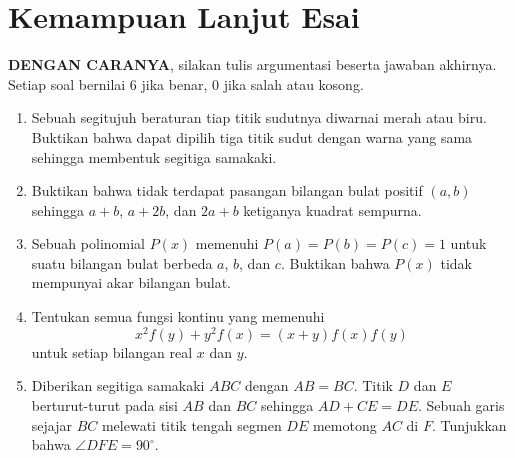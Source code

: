 \documentclass[12pt]{scrartcl}
\begin{document}
\section{Kemampuan Lanjut Esai}
\textbf{DENGAN CARANYA}, silakan tulis argumentasi beserta jawaban akhirnya. Setiap soal bernilai 6 jika benar, 0 jika salah atau kosong.
\begin{enumerate}[resume]
    \item Sebuah segitujuh beraturan tiap titik sudutnya diwarnai merah atau biru. Buktikan bahwa dapat dipilih tiga titik sudut dengan warna yang sama sehingga membentuk segitiga samakaki.
    \item Buktikan bahwa tidak terdapat pasangan bilangan bulat positif $(a, b)$ sehingga $a + b$, $a + 2b$, dan $2a + b$ ketiganya kuadrat sempurna.
    \item Sebuah polinomial $P(x)$ memenuhi $P(a) = P(b) = P(c) = 1$ untuk suatu bilangan bulat berbeda $a$, $b$, dan $c$. Buktikan bahwa $P(x)$ tidak mempunyai akar bilangan bulat.
    \item Tentukan semua fungsi kontinu yang memenuhi
        $$x^2f(y) + y^2f(x) = (x + y)f(x)f(y)$$
        untuk setiap bilangan real $x$ dan $y$.
    \item Diberikan segitiga samakaki $ABC$ dengan $AB = BC$. Titik $D$ dan $E$ berturut-turut pada sisi $AB$ dan $BC$ sehingga $AD + CE = DE$. Sebuah garis sejajar $BC$ melewati titik tengah segmen $DE$ memotong $AC$ di $F$. Tunjukkan bahwa $\angle DFE = 90^\circ$.
\end{enumerate}
\end{document}
